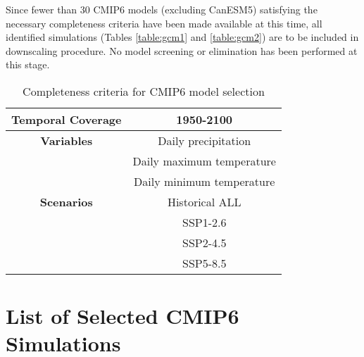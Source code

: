 \documentclass[]{scrartcl}
\begin{document}
Since fewer than 30 CMIP6 models (excluding CanESM5) satisfying the necessary completeness criteria have been made available at this time, all identified simulations (Tables \ref{table:gcm1} and \ref{table:gcm2}) are to be included in downscaling procedure. No model screening or elimination has been performed at this stage.

\renewcommand{\arraystretch}{1.5}%
\begin{table}[ht]
	\caption{Completeness criteria for CMIP6 model selection}\label{table:select}
	\begin{center}
		\begin{tabular}{|c|c|} 
			\hline
			\textbf{Temporal Coverage} & 1950-2100 \\
			\hline
			\textbf{Variables} & Daily precipitation \\
				 			   & Daily maximum temperature \\
				 			   & Daily minimum temperature \\
		  	\hline
			\textbf{Scenarios} & Historical ALL \\
							   & SSP1-2.6 \\
							   & SSP2-4.5 \\
							   & SSP5-8.5 \\
			\hline
\end{tabular}
\end{center}
\end{table}


\section{List of Selected CMIP6 Simulations}
\end{document}
